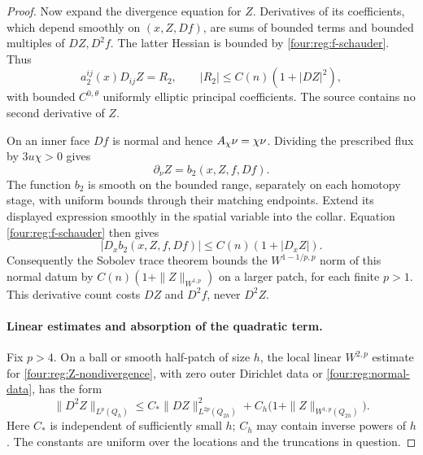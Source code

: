 \begin{proof}
Now expand the divergence equation for $Z$.  Derivatives of its
coefficients, which depend smoothly on $(x,Z,Df)$, are sums of
bounded terms and bounded multiples of $DZ,D^2f$.  The latter
Hessian is bounded by \eqref{four:reg:f-schauder}.  Thus
\begin{equation}\label{four:reg:Z-nondivergence}
 a_2^{ij}(x)D_{ij}Z=R_2,\qquad
 |R_2|\le C(n)(1+|DZ|^2),
\end{equation}
with bounded $C^{0,\theta}$ uniformly elliptic principal
coefficients.  The source contains no second derivative of $Z$.

On an inner face $Df$ is normal and hence $A_\chi\nu=\chi\nu$.
Dividing the prescribed flux by $3u\chi>0$ gives
\begin{equation}\label{four:reg:normal-data}
 \partial_\nu Z=b_2(x,Z,f,Df).
\end{equation}
The function $b_2$ is smooth on the bounded range, separately on
each homotopy stage, with uniform bounds through their matching
endpoints.  Extend its displayed expression smoothly in the
spatial variable into the collar.  Equation
\eqref{four:reg:f-schauder} then gives
\[
 |D_xb_2(x,Z,f,Df)|\le C(n)(1+|D_xZ|).
\]
Consequently the Sobolev trace theorem bounds the
$W^{1-1/p,p}$ norm of this normal datum by
$C(n)(1+\|Z\|_{W^{1,p}})$ on a larger patch, for each finite
$p>1$.  This derivative count costs $DZ$ and $D^2f$, never $D^2Z$.

\paragraph{Linear estimates and absorption of the quadratic term.}
Fix $p>4$.  On a ball or smooth half-patch of size $h$, the local
linear $W^{2,p}$ estimate for \eqref{four:reg:Z-nondivergence}, with
zero outer Dirichlet data or \eqref{four:reg:normal-data}, has the form
\begin{equation}\label{four:reg:Z-linear}
 \|D^2Z\|_{L^p(Q_h)}
 \le C_*\|DZ\|_{L^{2p}(Q_{2h})}^2
          +C_h\bigl(1+\|Z\|_{W^{1,p}(Q_{2h})}\bigr).
\end{equation}
Here $C_*$ is independent of sufficiently small $h$; $C_h$ may
contain inverse powers of $h$.  The constants are uniform over
the locations and the truncations in question.


\end{proof}
